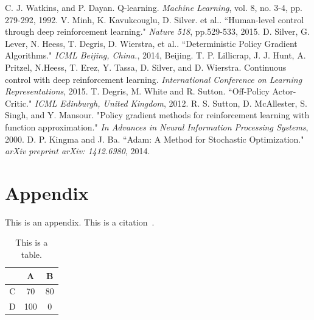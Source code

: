 \documentclass[english, dvipdfmx]{ampmt}             %
\def\numberofspines{1}
\begin{document}
\begin{thebibliography}{10}
C. J. Watkins, and P. Dayan. Q-learning. \textit{Machine Learning}, vol. 8, no. 3-4, pp. 279-292, 1992.
V. Minh, K. Kavukcouglu, D. Silver. et al.. “Human-level control through deep reinforcement learning." \textit{Nature 518}, pp.529-533, 2015.
D. Silver, G. Lever, N. Heess, T. Degris, D. Wierstra, et al.. “Deterministic Policy Gradient Algorithms." \textit{ICML Beijing, China.}, 2014, Beijing.
T. P. Lillicrap, J. J. Hunt, A. Pritzel, N.Heess, T. Erez, Y. Tassa, D. Silver, and D. Wierstra. Continuous control with deep reinforcement learning. \textit{International Conference on Learning Representations}, 2015.
T. Degris, M. White and R. Sutton. “Off-Policy Actor-Critic." \textit{ICML Edinburgh, United Kingdom}, 2012.
R. S. Sutton, D. McAllester, S. Singh, and Y. Mansour. "Policy gradient methods for reinforcement learning with function approximation." \textit{In Advances in Neural Information Processing Systems}, 2000.
D. P. Kingma and J. Ba. “Adam: A Method for Stochastic Optimization." \textit{arXiv preprint arXiv: 1412.6980}, 2014.

\end{thebibliography}

\appendix

\section{Appendix}
This is an appendix. This is a citation~\cite{polya1945}.

\begin{table}[htbp]
  \caption{This is a table.}
  \centering
  \begin{tabular}{c|cc}
      &  A  &  B \\
    \hline
    C &  70 & 80 \\
    D & 100 &  0
  \end{tabular}
\end{table}

\fi
\ifoutputcover
\cleardoublepage
\makecover                      %
\makespine[\numberofspines]     %
\fi
\ifoutputabstractforsubmission
\makeabstractforsubmission      %
\fi
\end{document}
